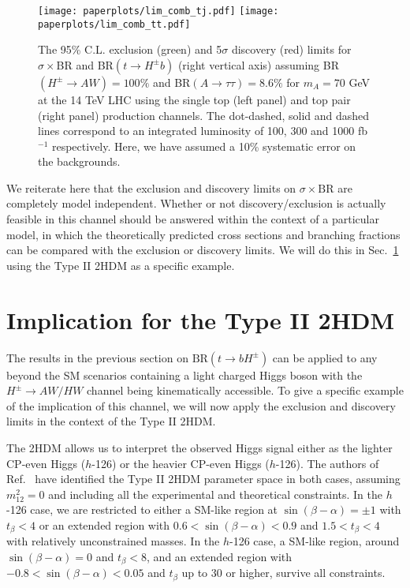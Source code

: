  \begin{figure}[h!]
 \centering
 	\texttt{[image: paperplots/lim\_comb\_tj.pdf]} \hspace{0.2 in}
 	\texttt{[image: paperplots/lim\_comb\_tt.pdf]}
\caption{The 95\% C.L. exclusion (green) and 5$\sigma$ discovery (red) limits for $\sigma \times $BR and BR$(t \rightarrow H^{\pm} b)$ (right vertical axis) assuming BR$(H^{\pm} \rightarrow A W)=100\%$ and BR$(A \rightarrow \tau\tau)=8.6\%$ for $m_A = 70$ GeV at the 14 TeV LHC using the single top (left panel) and top pair (right panel) production channels. The dot-dashed, solid and dashed lines correspond to an integrated luminosity of 100, 300 and 1000 fb$^{-1}$ respectively. Here, we have assumed a 10\% systematic error on the backgrounds. } 
\label{fig:ana_limits}
\end{figure}

 

We reiterate here that the exclusion and discovery limits on $\sigma \times \text{BR}$ are completely model independent. Whether or not discovery/exclusion is actually feasible in this channel should be answered within the context of a particular model, in which the theoretically predicted cross sections and branching fractions can be compared with the exclusion or discovery limits. We will do this in Sec.~\ref{sec:implication} using the Type II 2HDM as a specific example. 

\section{Implication for the Type II 2HDM}
 \label{sec:implication}

 The results in the previous section on $\text{BR}(t \rightarrow b H^{\pm})$ can be applied to any beyond the SM scenarios containing a light charged Higgs boson with the $H^{\pm} \rightarrow AW/HW$ channel being kinematically accessible. To give a specific example of the implication of this channel, we will now apply the exclusion and discovery limits in the context of the Type II 2HDM. 

 The 2HDM allows us to interpret the observed Higgs signal either as the lighter CP-even Higgs ($h$-126) or the heavier CP-even Higgs ($h$-126). The authors of Ref.~\cite{Coleppa:2013dya} have identified the Type II 2HDM parameter space in both cases, assuming $m_{12}^2=0$ and including all the experimental and theoretical constraints. In the $h$-126 case, we are restricted to either a SM-like region at $\sin(\beta-\alpha)=\pm1$ with $t_{\beta}<4$ or an extended region with $0.6<\sin(\beta-\alpha)<0.9$ and $1.5<t_{\beta}<4$ with relatively unconstrained masses. In the $h$-126 case, a SM-like region, around $\sin(\beta-\alpha)=0$ and $t_{\beta}<8$, and an extended region with $-0.8 < \sin(\beta-\alpha)<0.05$ and $t_{\beta}$ up to 30 or higher, survive all constraints. 
 
